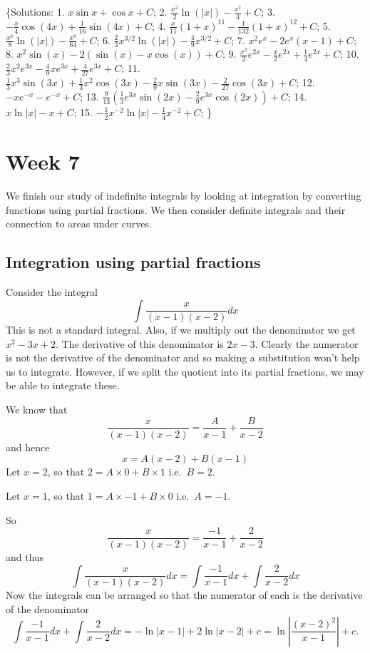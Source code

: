 \documentclass[
  11pt,
  oneside]{book}
\newcommand{\slide}{}
\theoremstyle{definition}
\theoremstyle{definition}
\theoremstyle{definition}
\theoremstyle{definition}
\theoremstyle{remark}
\begin{document}
\{Solutions:
1. \(x\sin x+\cos x + C\);
2. \(\frac{x^2}{2}\ln(|x|) - \frac{x^2}{4}+C\);
3. \(-\frac{x}{4}\cos(4x)+\frac{1}{16}\sin(4x)+C\);
4. \(\frac{x}{11}(1+x)^{11} - \frac{1}{132}(1+x)^{12}+C\);
5. \(\frac{x^8}{8}\ln(|x|) - \frac{x^8}{64}+C\);
6. \(\frac{2}{3}x^{3/2}\ln(|x|) - \frac{4}{9}x^{3/2}+C\);
7. \(x^2e^x - 2e^x(x-1)+C\);
8. \(x^2\sin(x) - 2(\sin(x)-x\cos(x))+C\);
9. \(\frac{x^2}{2}e^{2x}-\frac{x}{2}e^{2x}+\frac{1}{4}e^{2x}+C\);
10. \(\frac{2}{3}x^2e^{3x}-\frac{4}{9}xe^{3x}+\frac{4}{27}e^{3x}+C\);
11. \(\frac{1}{3}x^3\sin(3x)+\frac{1}{3}x^2\cos(3x)-\frac{2}{9}x\sin(3x)-\frac{2}{27}\cos(3x)+C\);
12. \(-xe^{-x}-e^{-x}+C\);
13. \(\frac{9}{13}\left( \frac{1}{3}e^{3x}\sin(2x)-\frac{2}{9}e^{3x}\cos(2x) \right)+C\);
14. \(x\ln|x| - x +C\);
15. \(-\frac{1}{2}x^{-2}\ln|x| - \frac{1}{4}x^{-2} + C\);
\}

\chapter{Week 7}\label{week-seven}

We finish our study of indefinite integrals by looking at integration by converting functions using partial fractions. We then consider definite integrals and their connection to areas under curves.
\slide

\section{Integration using partial fractions}\label{integration-using-partial-fractions}

Consider the integral
\[
\int\frac{x}{(x-1)(x-2)}dx
\]
This is not a standard integral. Also, if we multiply out the denominator we get \(x^2 - 3x + 2\). The derivative of this denominator is \(2x - 3\). Clearly the numerator is not the derivative of the denominator and so making a substitution won't help us to integrate. However, if we split the quotient into its partial fractions, we may be able to integrate these.

We know that
\[
\frac{x}{(x-1)(x-2)} = \frac A{x-1}+\frac B{x-2}
\]
and hence
\[
x = A(x-2)+B(x-1)
\]
Let \(x=2\), so that \(2=A\times0+B\times1\) i.e.~\(B=2\).

Let \(x=1\), so that \(1=A\times-1+B\times0\) i.e.~\(A=-1\).

So
\[
\frac{x}{(x-1)(x-2)} = \frac {-1}{x-1}+\frac 2{x-2}
\]
and thus
\[
\int\frac{x}{(x-1)(x-2)}dx = \int\frac {-1}{x-1}dx+\int\frac 2{x-2}dx
\]
Now the integrals can be arranged so that the numerator of each is the derivative of the denominator
\[
\int\frac {-1}{x-1}dx+\int\frac 2{x-2}dx = -\ln|x-1|+2\ln|x-2|+c = \ln\left|\frac{(x-2)^2}{x-1}\right|+c.
\]
\slide
\end{document}
